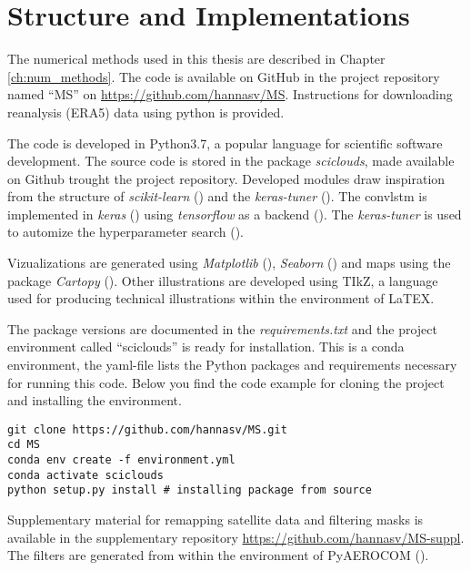 \section{Structure and Implementations} \label{sec:structure_and_implementations}
The numerical methods used in this thesis are described in Chapter \ref{ch:num_methods}. The code is available on GitHub in the project repository named ``MS'' on \href{https://github.com/hannasv/MS}{https://github.com/hannasv/MS}. Instructions for downloading reanalysis (ERA5) data using python is provided.

The code is developed in Python3.7, a popular language for scientific software development. The source code is stored in the package \textit{sciclouds}, made available on Github trought the project repository. Developed modules draw inspiration from the structure of \textit{scikit-learn} (\cite{sklearn_api}) and the \textit{keras-tuner} (\cite{chollet2015kerastuner}). The \acrshort{convlstm} is implemented in \textit{keras} (\cite{chollet2015keras}) using \textit{tensorflow} as a backend (\cite{tensorflow2015}). The \textit{keras-tuner} is used to automize the hyperparameter search (\cite{chollet2015kerastuner}). 

Vizualizations are generated using \textit{Matplotlib} (\cite{matplotlib}), \textit{Seaborn} (\cite{seaborn}) and maps using the package \textit{Cartopy} (\cite{Cartopy}). Other illustrations are developed using TIkZ, a language used for producing technical illustrations within the environment of LaTEX.


The package versions are documented in the \textit{requirements.txt} and the project environment called ``sciclouds'' is ready for installation. This is a conda environment, the yaml-file lists the Python packages and requirements necessary for running this code. Below you find the code example for cloning the project and installing the environment.

\begin{verbatim}
git clone https://github.com/hannasv/MS.git
cd MS
conda env create -f environment.yml
conda activate sciclouds
python setup.py install # installing package from source
\end{verbatim}

Supplementary material for remapping satellite data and filtering masks is available in the supplementary repository \href{https://github.com/hannasv/MS-suppl}{https://github.com/hannasv/MS-suppl}. %
The filters are generated from within the environment of PyAEROCOM (\cite{pyaerocom}). 


